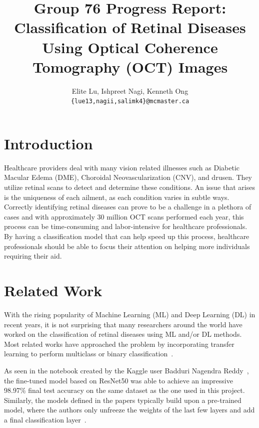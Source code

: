 \documentclass[11pt]{article}
\title{Group 76 Progress Report: Classification of Retinal Diseases Using Optical Coherence Tomography (OCT) Images}
\author{Elite Lu, Ishpreet Nagi, Kenneth Ong \\
  \texttt{\{lue13,nagii,salimk4\}@mcmaster.ca} }
\begin{document}
\maketitle






\section{Introduction}

Healthcare providers deal with many vision related illnesses such as Diabetic Macular Edema (DME), Choroidal Neovascularization (CNV), and drusen. They utilize retinal scans to detect and determine these conditions. An issue that arises is the uniqueness of each ailment, as each condition varies in subtle ways. Correctly identifying retinal diseases can prove to be a challenge in a plethora of cases and with approximately 30 million OCT scans performed each year, this process can be time-consuming and labor-intensive for healthcare professionals. By having a classification model that can help speed up this process, healthcare professionals should be able to focus their attention on helping more individuals requiring their aid.

\section{Related Work}

With the rising popularity of Machine Learning (ML) and Deep Learning (DL) in recent years, it is not surprising that many researchers around the world have worked on the classification of retinal diseases using ML and/or DL methods. Most related works have approached the problem by incorporating transfer learning to perform multiclass or binary classification~\citep{Kermany2018-dc, Miladinovic2024-og,Reddy_2025-nr}.

As seen in the notebook created by the Kaggle user Badduri Nagendra Reddy~\citeyearpar{Reddy_2025-nr}, the fine-tuned model based on ResNet50 was able to achieve an impressive 98.97\% final test accuracy on the same dataset as the one used in this project. Similarly, the models defined in the papers typically build upon a pre-trained model, where the authors only unfreeze the weights of the last few layers and add a final classification layer~\citep{Kermany2018-dc,Miladinovic2024-og}.
\end{document}
